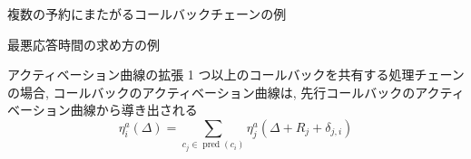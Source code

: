 \begin{frame}{複数の予約にまたがるコールバックチェーンの例}
\end{frame}

\begin{frame}{最悪応答時間の求め方の例}
\end{frame}

\begin{frame}{アクティベーション曲線の拡張}
    1 つ以上のコールバックを共有する処理チェーンの場合, コールバックのアクティベーション曲線は, 先行コールバックのアクティベーション曲線から導き出される
    \begin{equation*}
        \eta_{i}^{a}(\Delta)=\sum_{c_{j} \in \operatorname{pred}\left(c_{i}\right)} \eta_{j}^{a}\left(\Delta+R_{j}+\delta_{j, i}\right)
    \end{equation*}
\end{frame}





